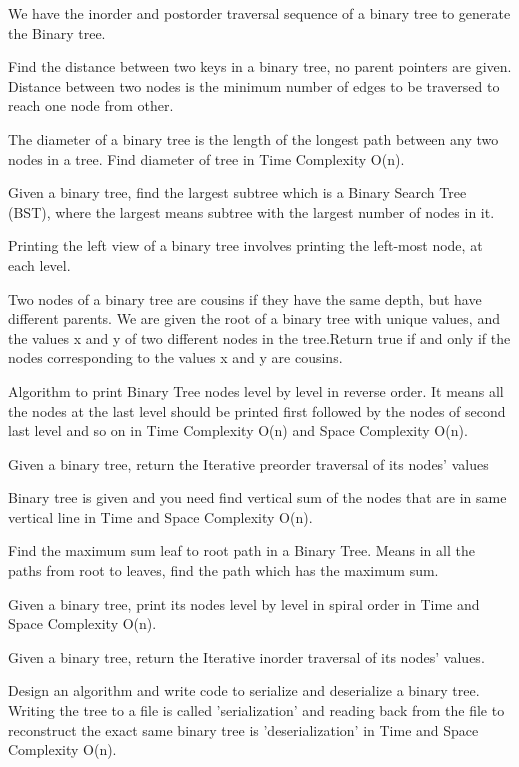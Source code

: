 {\begin{exercise}
\begin{compactenum}
    \item We have the inorder and postorder traversal sequence of a binary tree to generate the Binary tree.
    \item Find the distance between two keys in a binary tree, no parent pointers are given. Distance between two nodes is the minimum number of edges to be traversed to reach one node from other.
    \item The diameter of a binary tree is the length of the longest path between any two nodes in a tree. Find diameter of tree in Time Complexity O(n).
    \item Given a binary tree, find the largest subtree which is a Binary Search Tree (BST), where the largest means subtree with the largest number of nodes in it.
    \item Printing the left view of a binary tree involves printing the left-most node, at each level.
    \item Two nodes of a binary tree are cousins if they have the same depth, but have different parents. We are given the root of a binary tree with unique values, and the values x and y of two different nodes in the tree.Return true if and only if the nodes corresponding to the values x and y are cousins.
    \item Algorithm to print Binary Tree nodes level by level in reverse order. It means all the nodes at the last level should be printed first followed by the nodes of second last level and so on in Time Complexity O(n) and Space Complexity O(n).
    \item Given a binary tree, return the Iterative  preorder traversal of its nodes' values
    \item Binary tree is given and you need find vertical sum of the nodes that are in same vertical line in Time and Space Complexity O(n).
    \item Find the maximum sum leaf to root path in a Binary Tree. Means in all the paths from root to leaves, find the path which has the maximum sum.
    \item Given a binary tree, print its nodes level by level in spiral order in Time and Space Complexity O(n).
    \item Given a binary tree, return the Iterative inorder traversal of its nodes' values.
    \item Design an algorithm and write code to serialize and deserialize a binary tree. Writing the tree to a file is called 'serialization' and reading back from the file to reconstruct the exact same binary tree is 'deserialization' in Time and Space Complexity O(n).

\end{compactenum}
\end{exercise}}
